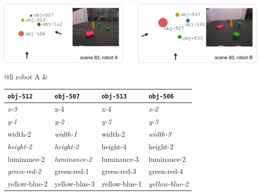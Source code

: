 
\parbox{\textwidth}{
  \renewcommand{\arraystretch}{1.3}
  \includegraphics[width=1\textwidth]{figures/qfwm-example-world-models-scene-83}

  \vspace{0.3cm}
  
  \begin{center}
  \begin{tabular}{@{}ll}
    robot A &
    \begin{tabular}{@{}llll@{}}
      {\tt obj-512} & {\tt obj-507} & {\tt obj-513} & {\tt obj-506}  \\
      \hline
      \textcolor{dark}{\slshape x-3 } & { x-4 } & { x-4} & \textcolor{dark}{\slshape  x-2} \\
      \textcolor{dark}{\slshape y-1} & \textcolor{dark}{\slshape y-2} & \textcolor{dark}{\slshape y-3} & \textcolor{dark}{\slshape y-3} \\
      { width-2} & \textcolor{dark}{\slshape width-1} & { width-2} & \textcolor{dark}{\slshape width-3} \\
      \textcolor{dark}{\slshape height-2} & \textcolor{dark}{\slshape height-2} & { height-4} & { height-2} \\
      { luminance-2} & \textcolor{dark}{\slshape luminance-2} & { luminance-3} & { luminance-2} \\
      \textcolor{dark}{\slshape green-red-2} & { green-red-1} & { green-red-3} & { green-red-4} \\
      { yellow-blue-2} & { yellow-blue-3} & { yellow-blue-1} & \textcolor{dark}{\slshape yellow-blue-2} \\
      \hline
      
    \end{tabular}
  \end{tabular}
  
  \vskip0.5cm
  

\end{center}}
